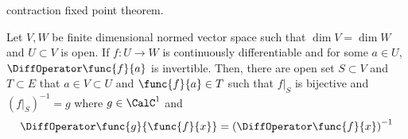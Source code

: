 contraction fixed point theorem.

\begin{theorem}
    Let \(V,W\) be finite dimensional normed vector space such that \(\dim V = \dim W\) and \(U \subset V\) is open. If \(f : U \to W\) is continuously differentiable and for some \(a \in U\), \(\DiffOperator \func{f}{a}\) is invertible. Then, there are open set \(S \subset V\) and \(T \subset E\) that \(a \in V \subset U\) and \(\func{f}{a} \in T\) such that \(f|_S\) is bijective and \((f|_S)^{-1} = g\) where \(g \in \CalC^1\) and
    \begin{equation*}
        \DiffOperator \func{g}{\func{f}{x}} = \left(\DiffOperator \func{f}{x}\right)^{-1}
    \end{equation*}
\end{theorem}

